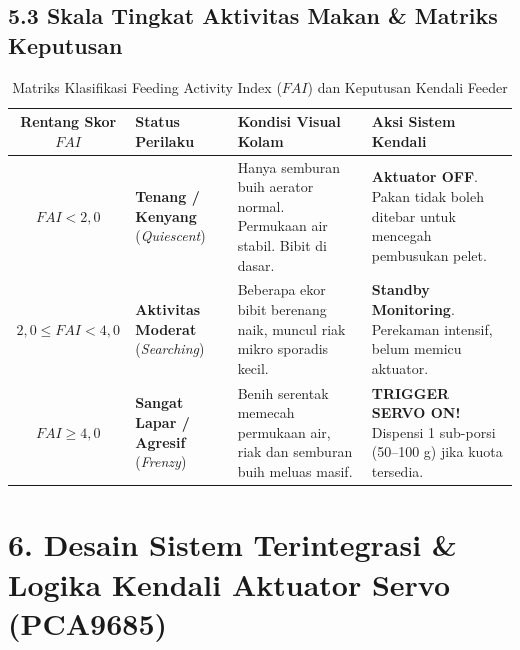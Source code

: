 \documentclass[10pt,a4paper]{article}
\begin{document}
\subsection*{5.3 Skala Tingkat Aktivitas Makan \& Matriks Keputusan}
\begin{table}[h!]
\centering
\small
\setlength{\tabcolsep}{3pt}
\caption{Matriks Klasifikasi Feeding Activity Index ($FAI$) dan Keputusan Kendali Feeder}
\label{tab:fai-matrix}
\begin{tabular}{|c|p{3.2cm}|p{5.5cm}|p{5.2cm}|}
\hline
\textbf{Rentang Skor $FAI$} & \textbf{Status Perilaku} & \textbf{Kondisi Visual Kolam} & \textbf{Aksi Sistem Kendali} \\
\hline
$FAI < 2,0$ & \textbf{Tenang / Kenyang} (\textit{Quiescent}) & Hanya semburan buih aerator normal. Permukaan air stabil. Bibit di dasar. & \textbf{Aktuator OFF}. Pakan tidak boleh ditebar untuk mencegah pembusukan pelet. \\
\hline
$2,0 \le FAI < 4,0$ & \textbf{Aktivitas Moderat} (\textit{Searching}) & Beberapa ekor bibit berenang naik, muncul riak mikro sporadis kecil. & \textbf{Standby Monitoring}. Perekaman intensif, belum memicu aktuator. \\
\hline
$FAI \ge 4,0$ & \textbf{Sangat Lapar / Agresif} (\textit{Frenzy}) & Benih serentak memecah permukaan air, riak dan semburan buih meluas masif. & \textbf{TRIGGER SERVO ON!} Dispensi 1 sub-porsi (50--100 g) jika kuota tersedia. \\
\hline
\end{tabular}
\end{table}

\newpage

\section*{6. Desain Sistem Terintegrasi \& Logika Kendali Aktuator Servo (PCA9685)}
\end{document}
